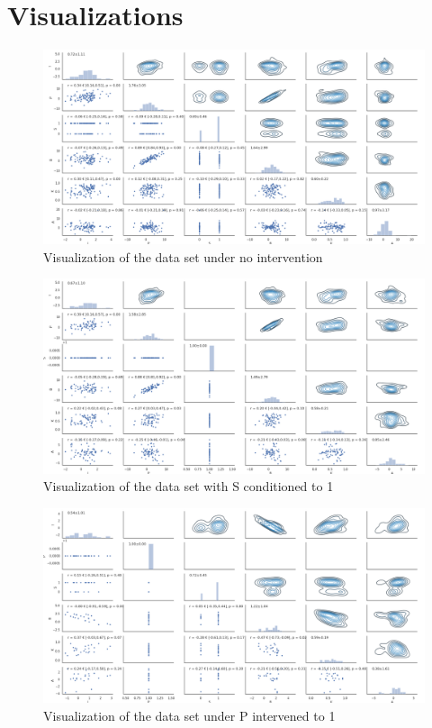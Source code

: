 \documentclass[12pt,fleqn,]{article}
\begin{document}
\section{Visualizations}
\begin{figure}[H]
	\centering
	\includegraphics[width=\linewidth]{interNonedata}
	\caption{Visualization of the data set under no intervention}
	\label{fig:interNonedata}
\end{figure}
\begin{figure}[H]
	\centering
	\includegraphics[width=\linewidth]{icondSdata}
	\caption{Visualization of the data set with S conditioned to 1}
	\label{fig:icondSdata}
\end{figure}
\begin{figure}[H]
	\centering
	\includegraphics[width=\linewidth]{interPdata}
	\caption{Visualization of the data set under P intervened to 1}
	\label{fig:interPdata}
\end{figure}
\end{document}
